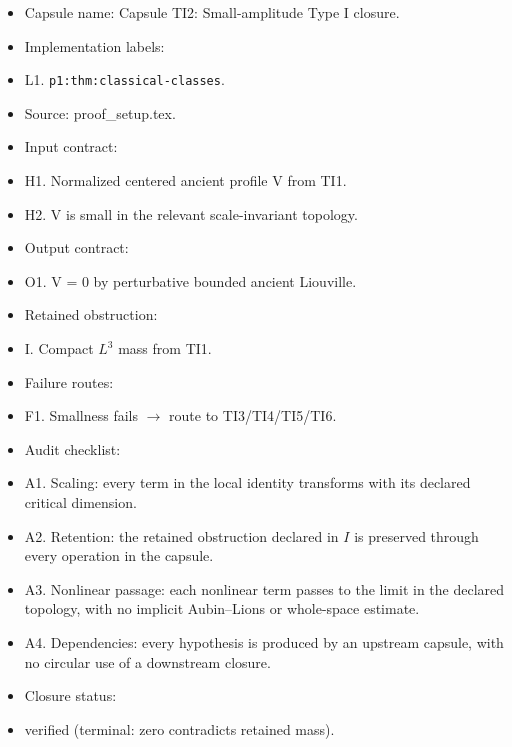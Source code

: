 \documentclass[11pt]{amsart}
\begin{document}
\begin{itemize}
  \item Capsule name: Capsule TI2: Small-amplitude Type I closure.
  \item Implementation labels:
  \item L1. \texttt{p1:thm:classical-classes}.
  \item Source: proof\_setup.tex.
  \item Input contract:
  \item H1. Normalized centered ancient profile V from TI1.
  \item H2. V is small in the relevant scale-invariant topology.
  \item Output contract:
  \item O1. V = 0 by perturbative bounded ancient Liouville.
  \item Retained obstruction:
  \item I. Compact $L^3$ mass from TI1.
  \item Failure routes:
  \item F1. Smallness fails $\to$ route to TI3/TI4/TI5/TI6.
  \item Audit checklist:
  \item A1. Scaling: every term in the local identity transforms with its declared critical dimension.
  \item A2. Retention: the retained obstruction declared in $I$ is preserved through every operation in the capsule.
  \item A3. Nonlinear passage: each nonlinear term passes to the limit in the declared topology, with no implicit Aubin--Lions or whole-space estimate.
  \item A4. Dependencies: every hypothesis is produced by an upstream capsule, with no circular use of a downstream closure.
  \item Closure status:
  \item verified (terminal: zero contradicts retained mass).
\end{itemize}
\end{document}
